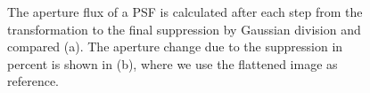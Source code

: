 \begin{figure}[H]
	\centering
\caption{The aperture flux of a PSF is calculated after each step from the transformation to the final suppression by Gaussian division and compared (a). The aperture change due to the suppression in percent is shown in (b), where we use the flattened image as reference.}
\label{fig:PSF1000_apertures}
\end{figure}

